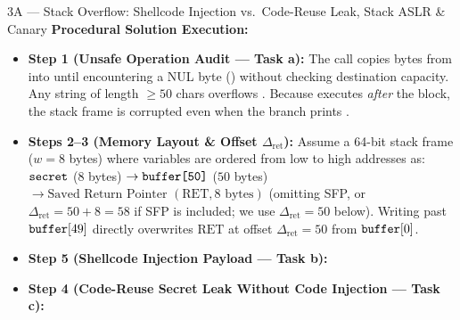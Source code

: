 \begin{templatebox}{3A --- Stack Overflow: Shellcode Injection vs.\ Code-Reuse Leak, Stack ASLR \& Canary}
\medskip
\textbf{Procedural Solution Execution:}
\begin{itemize}
  \item \textbf{Step 1 (Unsafe Operation Audit --- Task a):}
  The call  copies bytes from  into  until encountering a NUL byte () without checking destination capacity. Any  string of length $\ge 50$ chars overflows . Because  executes \emph{after} the  block, the stack frame is corrupted even when the  branch prints .
  \item \textbf{Steps 2--3 (Memory Layout \& Offset $\Delta_{\text{ret}}$):}
  Assume a 64-bit stack frame ($w = 8$ bytes) where variables are ordered from low to high addresses as: $\texttt{secret}$ ($8$ bytes) $\to \texttt{buffer[50]}$ ($50$ bytes) $\to \text{Saved Return Pointer } (\mathrm{RET}, 8\text{ bytes})$ (omitting SFP, or $\Delta_{\text{ret}} = 50 + 8 = 58$ if SFP is included; we use $\Delta_{\text{ret}} = 50$ below). Writing past $\texttt{buffer}[49]$ directly overwrites $\mathrm{RET}$ at offset $\Delta_{\text{ret}} = 50$ from $\texttt{buffer}[0]$.
  \item \textbf{Step 5 (Shellcode Injection Payload --- Task b):}
  \item \textbf{Step 4 (Code-Reuse Secret Leak Without Code Injection --- Task c):}

\end{itemize}
\end{templatebox}
